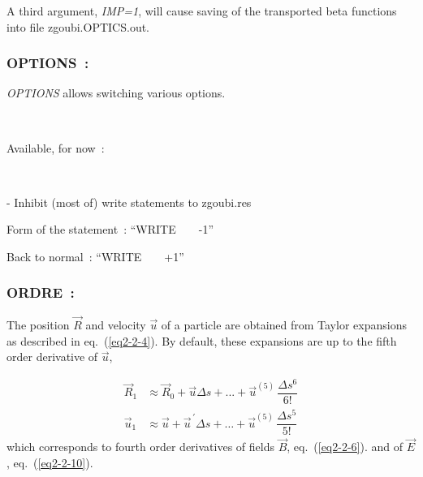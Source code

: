 \bigskip

\noindent A third argument, \textsl{IMP=1}, will cause saving of the transported beta functions into 
file zgoubi.OPTICS.out.








\newpage

\subsubsection*{OPTIONS~: \OPTIONSTitl} \label{OPTIONS} 

\medskip

\textsl{OPTIONS} allows switching various options. 

~

\noindent Available, for now~: 

~

\noindent - Inhibit (most of) write statements to zgoubi.res

Form of the statement~: ``WRITE ~ ~   -1''

Back to normal~: ``WRITE ~ ~  +1''










 \newpage

\subsubsection*{ORDRE~: \ORDRETitl } \label{ORDRE} 
\medskip

 The position $ \vec  R $ and velocity $ \vec  u $ of a particle are
obtained from Taylor expansions as described in eq.~(\ref{eq2-2-4}). By default, these 
expansions are up to the fifth order derivative of $ \vec  u$, 

\begin{align*}
	\vec  R_1 
	     & \approx  \vec  R_0 + \vec  u \Delta s +...+ \vec u^{(5)} \, \dfrac{\Delta s^6 }{ 6!} \\
	\vec  u_1 
	     & \approx  \vec  u + \vec  u^{\,\prime} \Delta s  
	        + \ldots + \vec  u^{(5)}\, \dfrac{\Delta s^5 }{ 5!}   
\end{align*}
%
 which corresponds to fourth order derivatives of fields $ \vec  B $, eq.~(\ref{eq2-2-6}).
 and of $ \vec  E $, eq.~(\ref{eq2-2-10}). 

\smallskip

